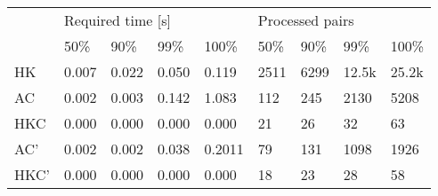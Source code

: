 \begin{tabular}{l|llll|llll}
\multirow{2}{*}{} & \multicolumn{4}{l|}{Required time {[}s{]}} & \multicolumn{4}{l}{Processed pairs} \\ \cline{2-9}
                  & 50\%     & 90\%     & 99\%     & 100\%     & 50\%   & 90\%   & 99\%    & 100\%   \\ \hline
HK                & 0.007    & 0.022    & 0.050    & 0.119     & 2511   & 6299   & 12.5k   & 25.2k   \\
AC                & 0.002    & 0.003    & 0.142    & 1.083     & 112    & 245    & 2130    & 5208    \\
HKC               & 0.000    & 0.000    & 0.000    & 0.000     & 21     & 26     & 32      & 63      \\
AC'               & 0.002    & 0.002    & 0.038    & 0.2011    & 79     & 131    & 1098    & 1926    \\
HKC'              & 0.000    & 0.000    & 0.000    & 0.000     & 18     & 23     & 28      & 58
\end{tabular}
